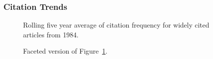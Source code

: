 \documentclass[
  10pt,
  letterpaper,
  DIV=11,
  numbers=noendperiod,
  twoside]{scrartcl}
\begin{document}
\subsubsection*{Citation Trends}\label{citation-trends-8}

\begin{figure}


\caption{\label{fig-citation-spaghetti-1984}Rolling five year average of
citation frequency for widely cited articles from 1984.}

\end{figure}%

\begin{figure}


\caption{\label{fig-citation-facet-1984}Faceted version of
Figure~\ref{fig-citation-spaghetti-1984}.}

\end{figure}%
\end{document}

